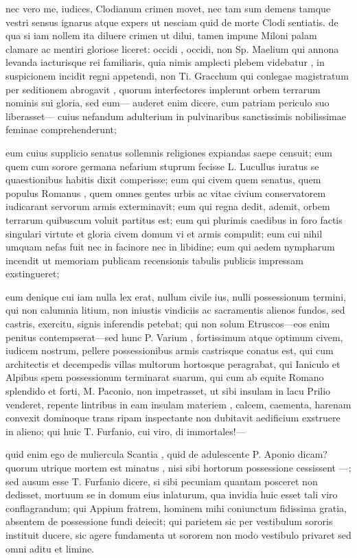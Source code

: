  nec vero me, iudices, Clodianum crimen movet, nec tam sum demens tamque vestri sensus ignarus atque expers ut nesciam quid de morte Clodi sentiatis. de qua si iam nollem ita diluere crimen ut dilui, tamen impune Miloni palam clamare ac mentiri gloriose liceret: occidi , occidi, non Sp. Maelium qui annona levanda iacturisque rei familiaris, quia nimis amplecti plebem videbatur , in suspicionem incidit regni appetendi, non Ti. Gracchum qui conlegae magistratum per seditionem abrogavit , quorum interfectores implerunt orbem terrarum nominis sui gloria, sed eum— auderet enim dicere, cum patriam periculo suo liberasset— cuius nefandum adulterium in pulvinaribus sanctissimis nobilissimae feminae comprehenderunt;

 eum cuius supplicio senatus sollemnis religiones expiandas saepe censuit; eum quem cum sorore germana nefarium stuprum fecisse L. Lucullus iuratus se quaestionibus habitis dixit comperisse; eum qui civem quem senatus, quem populus Romanus , quem omnes gentes urbis ac vitae civium conservatorem iudicarant servorum armis exterminavit; eum qui regna dedit, ademit, orbem terrarum quibuscum voluit partitus est; eum qui plurimis caedibus in foro factis singulari virtute et gloria civem domum vi et armis compulit; eum cui nihil umquam nefas fuit nec in facinore nec in libidine; eum qui aedem nympharum incendit ut memoriam publicam recensionis tabulis publicis impressam exstingueret;

 eum denique cui iam nulla lex erat, nullum civile ius, nulli possessionum termini, qui non calumnia litium, non iniustis vindiciis ac sacramentis alienos fundos, sed castris, exercitu, signis inferendis petebat; qui non solum Etruscos—eos enim penitus contempserat—sed hunc P. Varium , fortissimum atque optimum civem, iudicem nostrum, pellere possessionibus armis castrisque conatus est, qui cum architectis et decempedis villas multorum hortosque peragrabat, qui Ianiculo et Alpibus spem possessionum terminarat suarum, qui cum ab equite Romano splendido et forti, M. Paconio, non impetrasset, ut sibi insulam in lacu Prilio venderet, repente lintribus in eam insulam materiem , calcem, caementa, harenam convexit dominoque trans ripam inspectante non dubitavit aedificium exstruere in alieno; qui huic T. Furfanio, cui viro, di immortales!—

 quid enim ego de muliercula Scantia , quid de adulescente P. Aponio dicam? quorum utrique mortem est minatus , nisi sibi hortorum possessione cessissent —; sed ausum esse T. Furfanio dicere, si sibi pecuniam quantam posceret non dedisset, mortuum se in domum eius inlaturum, qua invidia huic esset tali viro conflagrandum; qui Appium fratrem, hominem mihi coniunctum fidissima gratia, absentem de possessione fundi deiecit; qui parietem sic per vestibulum sororis instituit ducere, sic agere fundamenta ut sororem non modo vestibulo privaret sed omni aditu et limine.

